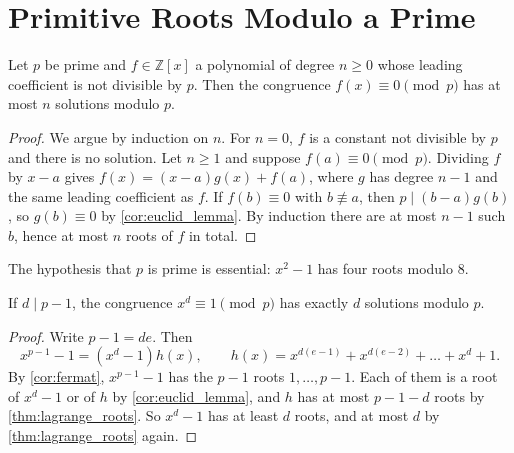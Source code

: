 \section{Primitive Roots Modulo a Prime}

\begin{theorem}[Lagrange]\label{thm:lagrange_roots}
    Let $p$ be prime and $f \in \mathbb{Z}[x]$ a polynomial of degree $n \ge 0$ whose leading coefficient is not divisible by $p$. Then the congruence $f(x) \equiv 0 \pmod p$ has at most $n$ solutions modulo $p$.
\end{theorem}
\begin{proof}
    We argue by induction on $n$. For $n = 0$, $f$ is a constant not divisible by $p$ and there is no solution. Let $n \ge 1$ and suppose $f(a) \equiv 0 \pmod p$. Dividing $f$ by $x - a$ gives $f(x) = (x - a)g(x) + f(a)$, where $g$ has degree $n - 1$ and the same leading coefficient as $f$. If $f(b) \equiv 0$ with $b \not\equiv a$, then $p \mid (b-a)g(b)$, so $g(b) \equiv 0$ by \cref{cor:euclid_lemma}. By induction there are at most $n - 1$ such $b$, hence at most $n$ roots of $f$ in total.
\end{proof}
The hypothesis that $p$ is prime is essential: $x^2 - 1$ has four roots modulo $8$.

\begin{lemma}\label{lem:roots_xd_minus_1}
    If $d \mid p - 1$, the congruence $x^d \equiv 1 \pmod p$ has exactly $d$ solutions modulo $p$.
\end{lemma}
\begin{proof}
    Write $p - 1 = de$. Then
    \begin{equation*}
        x^{p-1} - 1 = (x^d - 1)h(x), \qquad h(x) = x^{d(e-1)} + x^{d(e-2)} + \dots + x^d + 1.
    \end{equation*}
    By \cref{cor:fermat}, $x^{p-1} - 1$ has the $p - 1$ roots $1, \dots, p-1$. Each of them is a root of $x^d - 1$ or of $h$ by \cref{cor:euclid_lemma}, and $h$ has at most $p - 1 - d$ roots by \cref{thm:lagrange_roots}. So $x^d - 1$ has at least $d$ roots, and at most $d$ by \cref{thm:lagrange_roots} again.
\end{proof}

